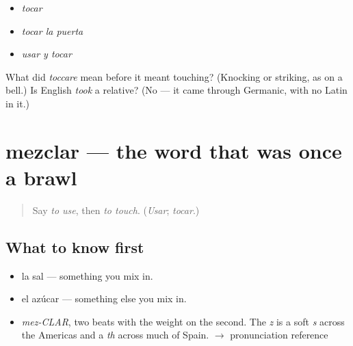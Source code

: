\begin{itemize}
\raggedright
  \item \emph{tocar}
  \item \emph{tocar la puerta}
  \item \emph{usar y tocar}
\end{itemize}

\begin{tcolorbox}[breakable,colback=teal!4,colframe=teal!35!black,title={Before you move on}]
What did \emph{toccare} mean before it meant touching? (Knocking or striking, as on a bell.) Is English \emph{took} a relative? (No — it came through Germanic, with no Latin in it.)
\end{tcolorbox}
\section[mezclar]{mezclar — the word that was once a brawl}

\label{lesson:ES-C385-mezclar}



\begin{quote}
Say \emph{to use}, then \emph{to touch}. (\emph{Usar}; \emph{tocar}.)
\end{quote}

\subsection*{What to know first}
\begin{itemize}
\raggedright
  \item la sal — something you mix in.
  \item el azúcar — something else you mix in.
\end{itemize}

\begin{sounds}
\begin{itemize}
\raggedright
  \item \emph{mez-CLAR}, two beats with the weight on the second. The \emph{z} is a soft \emph{s} across the Americas and a \emph{th} across much of Spain. $\to$ pronunciation reference
\end{itemize}
\end{sounds}

